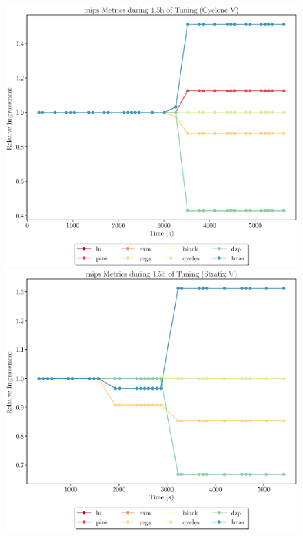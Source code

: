 \documentclass[12pt, a4paper]{article}
\begin{document}
\begin{figure}[htpb]
    \begin{minipage}{.48\textwidth}
        \includegraphics[scale=.29]{mips_all_5400_chstone_CycloneV}
    \end{minipage}%
    \hfill
    \begin{minipage}{.48\textwidth}
        \includegraphics[scale=.29]{mips_all_5400_chstone_StratixV}
    \end{minipage}%
\end{figure}
\end{document}
